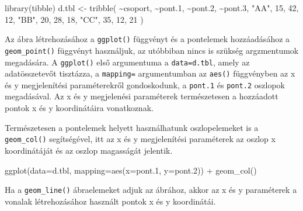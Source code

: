 \documentclass[
]{book}
\newenvironment{Shaded}{\begin{snugshade}}{\end{snugshade}}
\newcommand{\AttributeTok}[1]{\textcolor[rgb]{0.77,0.63,0.00}{#1}}
\newcommand{\DecValTok}[1]{\textcolor[rgb]{0.00,0.00,0.81}{#1}}
\newcommand{\FloatTok}[1]{\textcolor[rgb]{0.00,0.00,0.81}{#1}}
\newcommand{\FunctionTok}[1]{\textcolor[rgb]{0.00,0.00,0.00}{#1}}
\newcommand{\NormalTok}[1]{#1}
\newcommand{\OtherTok}[1]{\textcolor[rgb]{0.56,0.35,0.01}{#1}}
\newcommand{\SpecialCharTok}[1]{\textcolor[rgb]{0.00,0.00,0.00}{#1}}
\newcommand{\StringTok}[1]{\textcolor[rgb]{0.31,0.60,0.02}{#1}}
\begin{document}
\begin{Shaded}
\begin{Highlighting}[]
\FunctionTok{library}\NormalTok{(tibble)}
\NormalTok{d.tbl }\OtherTok{\textless{}{-}} \FunctionTok{tribble}\NormalTok{(}
  \SpecialCharTok{\textasciitilde{}}\NormalTok{csoport, }\SpecialCharTok{\textasciitilde{}}\NormalTok{pont}\FloatTok{.1}\NormalTok{, }\SpecialCharTok{\textasciitilde{}}\NormalTok{pont}\FloatTok{.2}\NormalTok{, }\SpecialCharTok{\textasciitilde{}}\NormalTok{pont}\FloatTok{.3}\NormalTok{,}
  \StringTok{"AA"}\NormalTok{, }\DecValTok{15}\NormalTok{, }\DecValTok{42}\NormalTok{, }\DecValTok{12}\NormalTok{, }
  \StringTok{"BB"}\NormalTok{, }\DecValTok{20}\NormalTok{, }\DecValTok{28}\NormalTok{, }\DecValTok{18}\NormalTok{,}
  \StringTok{"CC"}\NormalTok{, }\DecValTok{35}\NormalTok{, }\DecValTok{12}\NormalTok{, }\DecValTok{21}
\NormalTok{)}
\end{Highlighting}
\end{Shaded}

Az ábra létrehozásához a \texttt{ggplot()} függvényt és a pontelemek hozzáadásához a \texttt{geom\_point()} függvényt használjuk, az utóbbiban nincs is szükség argzmentumok megadására. A \texttt{ggplot()} első argumentuma a \texttt{data=d.tbl}, amely az adatösszetevőt tisztázza, a \texttt{mapping=} argumentumban az \texttt{aes()} függvényben az x és y megjelenítési paraméterekről gondoskodunk, a \texttt{pont.1} és \texttt{pont.2} oszlopok megadásával. Az x és y megjelenési paraméterek természetesen a hozzáadott pontok x és y koordinátáira vonatkoznak.

Természetesen a pontelemek helyett használhatunk oszlopelemeket is a \texttt{geom\_col()} segítségével, itt az x és y megjelenítési paraméterek az oszlop x koordinátáját és az oszlop magasságát jelentik.

\begin{Shaded}
\begin{Highlighting}[]
\FunctionTok{ggplot}\NormalTok{(}\AttributeTok{data=}\NormalTok{d.tbl, }\AttributeTok{mapping=}\FunctionTok{aes}\NormalTok{(}\AttributeTok{x=}\NormalTok{pont}\FloatTok{.1}\NormalTok{, }\AttributeTok{y=}\NormalTok{pont}\FloatTok{.2}\NormalTok{)) }\SpecialCharTok{+} \FunctionTok{geom\_col}\NormalTok{()}
\end{Highlighting}
\end{Shaded}

Ha a \texttt{geom\_line()} ábraelemeket adjuk az ábrához, akkor az x és y paraméterek a vonalak létrehozásához használt pontok x és y koordinátái.
\end{document}
